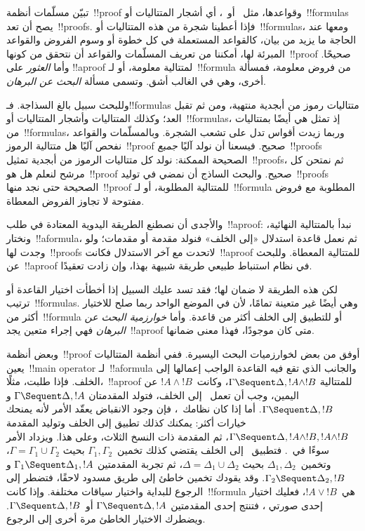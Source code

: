 \documentclass[../../../include/open-logic-section]{subfiles}
\begin{document}


تبيّن مسلّمات أنظمة~!!{proof} وقواعدها، مثل~ أو~،
أي أشجار المتتاليات أو~!!{formula}s يصح أن تعد~!!{proof}s. فإذا أعطينا
شجرة من هذه المتتاليات أو~!!{formula}s، ومعها عند الحاجة ما يزيد من بيان، كالقواعد المستعملة في كل
خطوة أو وسوم الفروض والقواعد المبرئة لها، أمكننا من تعريف المسلّمات
والقواعد أن نتحقق من كونها~!!{proof} صحيحًا. وأما \emph{العثور} على
!!a{proof} لمتتالية معلومة، أو لـ~!!{formula} من فروض معلومة، فمسألة
أخرى، وهي في الغالب أشق. وتسمى مسألة \emph{البحث عن البرهان}.

وللبحث سبيل بالغ السذاجة. فـ!!{formula}s متتاليات رموز من أبجدية منتهية،
ومن ثم تقبل العد؛ وكذلك المتتاليات وأشجار المتتاليات أو~!!{formula}s،
إذ تمثل هي أيضًا بمتتاليات من~!!{formula}s، وربما زيدت أقواس تدل على
تشعب الشجرة. وبالمسلّمات والقواعد نفحص آليًا هل متتالية الرموز~!!{proof}
صحيح. فيسعنا أن نولد آليًا \emph{جميع}~!!{proof}s الصحيحة الممكنة: نولد
كل متتاليات الرموز من أبجدية تمثيل~!!{proof}s، ثم نمتحن كل مرشح لنعلم
هل هو~!!{proof} صحيح. والبحث الساذج أن نمضي في توليد~!!{proof}s الصحيحة
حتى نجد منها~!!{proof} للمتتالية المطلوبة، أو لـ~!!{formula} المطلوبة
مع فروض مفتوحة لا تجاوز الفروض المعطاة.

والأجدى أن نصطنع الطريقة اليدوية المعتادة في طلب~!!a{proof}: نبدأ
بالمتتالية النهائية، ونختار~!!a{formula}، ثم نعمل قاعدة استدلال «إلى
الخلف» فنولد مقدمة أو مقدمات؛ ولو وجدت لها~!!{proof}s لاتحدت مع آخر
الاستدلال فكانت~!!a{proof} للمتتالية المعطاة. وللبحث عن~!!a{proof} في
نظام استنباط طبيعي طريقة شبيهة بهذا، وإن زادت تعقيدًا.

لكن هذه الطريقة لا ضمان لها؛ فقد تسد عليك السبيل إذا أخطأت اختيار القاعدة
أو ترتيب~!!{formula}s. وهي أيضًا غير متعينة تمامًا، لأن في الموضع الواحد
ربما صلح للاختيار أكثر من~!!{formula} أو للتطبيق إلى الخلف أكثر من قاعدة.
وأما \emph{خوارزمية البحث عن البرهان} فهي إجراء متعين يجد~!!a{proof}
متى كان موجودًا، فهذا معنى ضمانها.

وبعض أنظمة~!!{proof} أوفق من بعض لخوارزميات البحث اليسيرة. ففي أنظمة
المتتاليات يعين~!!{main operator} لـ~!!a{formula} والجانب الذي تقع فيه
القاعدة الواجب إعمالها إلى الخلف. فإذا طلبت، مثلًا،~!!a{proof} للمتتالية
$\Gamma \Sequent \Delta,!A\land !B$، وكانت~$!A\land !B$ عن اليمين،
وجب أن تعمل~\RightR{\land} إلى الخلف، فتولد المقدمتان
$\Gamma \Sequent \Delta,!A$ و
$\Gamma \Sequent \Delta,!B$. أما إذا كان نظامك~، فإن وجود
الانقباض يعقّد الأمر لأنه يمنحك خيارات أكثر: يمكنك كذلك تطبيق
\RightR{\Contraction} إلى الخلف وتوليد المقدمة
$\Gamma \Sequent \Delta,!A\land !B,!A\land !B$، ثم المقدمة ذات النسخ
الثلاث، وعلى هذا. ويزداد الأمر سوءًا في~. فتطبيق~\RightR{\land} إلى
الخلف يقتضي كذلك تخمين~$\Gamma_1,\Gamma_2$ بحيث
$\Gamma=\Gamma_1\cup\Gamma_2$، وتخمين~$\Delta_1,\Delta_2$ بحيث
$\Delta=\Delta_1\cup\Delta_2$، ثم تجربة المقدمتين
$\Gamma_1\Sequent\Delta_1,!A$ و$\Gamma_2\Sequent\Delta_2,!B$. وقد يقودك
تخمين خاطئ إلى طريق مسدود لاحقًا، فتضطر إلى الرجوع للبداية واختيار سياقات
مختلفة. وإذا كانت~!!{formula} هي~$!A\lor !B$، فعليك اختيار إحدى صورتي
\RightR{\lor}، فتنتج إحدى المقدمتين
$\Gamma\Sequent\Delta,!A$ أو~$\Gamma\Sequent\Delta,!B$. ويضطرك الاختيار
الخاطئ مرة أخرى إلى الرجوع.
\end{document}
